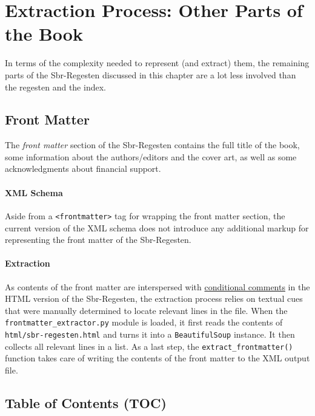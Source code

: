 \section{Extraction Process: Other Parts of the Book}
\label{sec:other}

In terms of the complexity needed to represent (and extract) them, the
remaining parts of the Sbr-Regesten discussed in this chapter are a
lot less involved than the regesten and the index.

\subsection{Front Matter}
\label{sec:frontmatter}

The \emph{front matter} section of the Sbr-Regesten contains the full
title of the book, some information about the authors/editors and the
cover art, as well as some acknowledgments about financial support.

\paragraph{XML Schema}

Aside from a \texttt{<frontmatter>} tag for wrapping the front matter
section, the current version of the XML schema does not introduce any
additional markup for representing the front matter of the
Sbr-Regesten.

\paragraph{Extraction}

As contents of the front matter are interspersed with
\href{https://en.wikipedia.org/wiki/Conditional_comment}{conditional
  comments} in the HTML version of the Sbr-Regesten, the extraction
process relies on textual cues that were manually determined to locate
relevant lines in the file. When the
\texttt{frontmatter\_extractor.py} module is loaded, it first reads
the contents of \texttt{html/sbr-regesten.html} and turns it into a
\texttt{BeautifulSoup} instance. It then collects all relevant lines
in a list. As a last step, the \texttt{extract\_frontmatter()}
function takes care of writing the contents of the front matter to the
XML output file.

\subsection{Table of Contents (TOC)}
\label{sec:toc}

